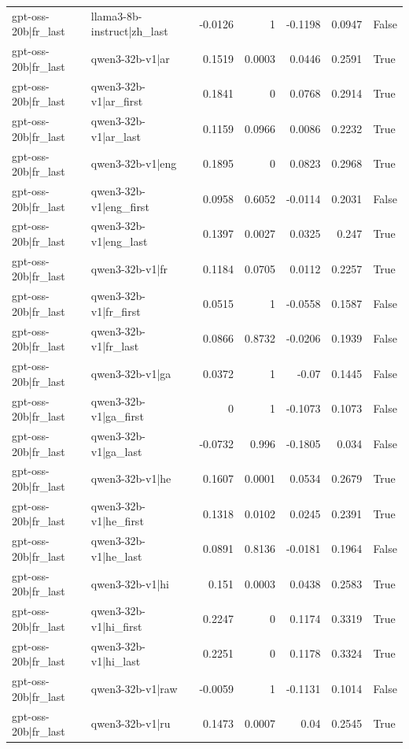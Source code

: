 \begin{table}
\begin{tabular}{l l r r r r l}
gpt-oss-20b|fr_last & llama3-8b-instruct|zh_last & -0.0126 & 1 & -0.1198 & 0.0947 & False \\
gpt-oss-20b|fr_last & qwen3-32b-v1|ar & 0.1519 & 0.0003 & 0.0446 & 0.2591 & True \\
gpt-oss-20b|fr_last & qwen3-32b-v1|ar_first & 0.1841 & 0 & 0.0768 & 0.2914 & True \\
gpt-oss-20b|fr_last & qwen3-32b-v1|ar_last & 0.1159 & 0.0966 & 0.0086 & 0.2232 & True \\
gpt-oss-20b|fr_last & qwen3-32b-v1|eng & 0.1895 & 0 & 0.0823 & 0.2968 & True \\
gpt-oss-20b|fr_last & qwen3-32b-v1|eng_first & 0.0958 & 0.6052 & -0.0114 & 0.2031 & False \\
gpt-oss-20b|fr_last & qwen3-32b-v1|eng_last & 0.1397 & 0.0027 & 0.0325 & 0.247 & True \\
gpt-oss-20b|fr_last & qwen3-32b-v1|fr & 0.1184 & 0.0705 & 0.0112 & 0.2257 & True \\
gpt-oss-20b|fr_last & qwen3-32b-v1|fr_first & 0.0515 & 1 & -0.0558 & 0.1587 & False \\
gpt-oss-20b|fr_last & qwen3-32b-v1|fr_last & 0.0866 & 0.8732 & -0.0206 & 0.1939 & False \\
gpt-oss-20b|fr_last & qwen3-32b-v1|ga & 0.0372 & 1 & -0.07 & 0.1445 & False \\
gpt-oss-20b|fr_last & qwen3-32b-v1|ga_first & 0 & 1 & -0.1073 & 0.1073 & False \\
gpt-oss-20b|fr_last & qwen3-32b-v1|ga_last & -0.0732 & 0.996 & -0.1805 & 0.034 & False \\
gpt-oss-20b|fr_last & qwen3-32b-v1|he & 0.1607 & 0.0001 & 0.0534 & 0.2679 & True \\
gpt-oss-20b|fr_last & qwen3-32b-v1|he_first & 0.1318 & 0.0102 & 0.0245 & 0.2391 & True \\
gpt-oss-20b|fr_last & qwen3-32b-v1|he_last & 0.0891 & 0.8136 & -0.0181 & 0.1964 & False \\
gpt-oss-20b|fr_last & qwen3-32b-v1|hi & 0.151 & 0.0003 & 0.0438 & 0.2583 & True \\
gpt-oss-20b|fr_last & qwen3-32b-v1|hi_first & 0.2247 & 0 & 0.1174 & 0.3319 & True \\
gpt-oss-20b|fr_last & qwen3-32b-v1|hi_last & 0.2251 & 0 & 0.1178 & 0.3324 & True \\
gpt-oss-20b|fr_last & qwen3-32b-v1|raw & -0.0059 & 1 & -0.1131 & 0.1014 & False \\
gpt-oss-20b|fr_last & qwen3-32b-v1|ru & 0.1473 & 0.0007 & 0.04 & 0.2545 & True \\

\end{tabular}
\end{table}
